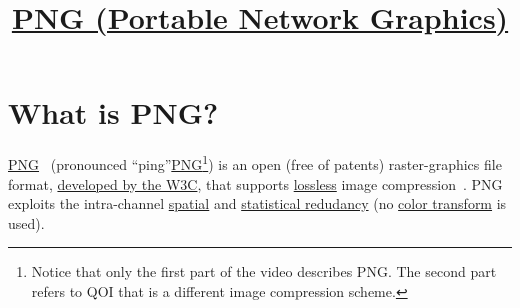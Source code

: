 \title{\href{http://www.libpng.org/pub/png}{PNG (Portable
  Network Graphics)}}

\maketitle
\tableofcontents

\section{What is PNG?}

\href{https://en.wikipedia.org/wiki/Portable_Network_Graphics}{PNG}~\cite{roelofs1999png,world2003portable}
(pronounced
``ping''\href{https://www.youtube.com/watch?v=EFUYNoFRHQI}{PNG}\footnote{Notice
  that only the first part of the video describes PNG. The second part
  refers to QOI that is a different image compression scheme.}) is an
open (free of patents) raster-graphics file format,
\href{https://en.wikipedia.org/wiki/Portable_Network_Graphics}{developed
  by the W3C}, that supports
\href{https://en.wikipedia.org/wiki/Lossless_compression}{lossless}
image compression~\cite{roelofs1999png,world2003portable}. PNG exploits the
intra-channel
\href{https://en.wikipedia.org/wiki/Image_compression}{spatial} and
\href{https://en.wikipedia.org/wiki/Data_compression}{statistical
  redudancy} (no \href{https://en.wikipedia.org/wiki/YUV}{color
  transform} is used).

